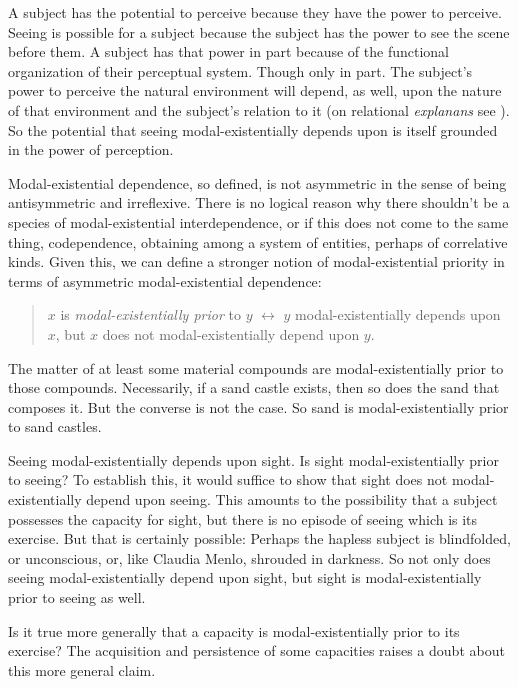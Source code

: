 \documentclass[12pt]{article}
\begin{document}

A subject has the potential to perceive because they have the power to perceive. Seeing is possible for a subject because the subject has the power to see the scene before them. A subject has that power in part because of the functional organization of their perceptual system. Though only in part. The subject's power to perceive the natural environment will depend, as well, upon the nature of that environment and the subject's relation to it (on relational \emph{explanans} see \citealt{Peacocke:1993kx,Williamson:2000lr}). So the potential that seeing modal-existentially depends upon is itself grounded in the power of perception.

Modal-existential dependence, so defined, is not asymmetric in the sense of being antisymmetric and irreflexive. There is no logical reason why there shouldn't be a species of modal-existential interdependence, or if this does not come to the same thing, codependence, obtaining among a system of entities, perhaps of correlative kinds. Given this, we can define a stronger notion of modal-existential priority in terms of asymmetric modal-existential dependence:
\begin{quote}
    \( x \) is \emph{modal-existentially prior} to \( y \) \( \leftrightarrow \) \( y \) modal-existentially depends upon \( x \), but \( x \) does not modal-existentially depend upon \( y \).
\end{quote}
The matter of at least some material compounds are modal-existentially prior to those compounds. Necessarily, if a sand castle exists, then so does the sand that composes it. But the converse is not the case. So sand is modal-existentially prior to sand castles.

Seeing modal-existentially depends upon sight. Is sight modal-existentially prior to seeing? To establish this, it would suffice to show that sight does not modal-existentially depend upon seeing. This amounts to the possibility that a subject possesses the capacity for sight, but there is no episode of seeing which is its exercise. But that is certainly possible: Perhaps the hapless subject is blindfolded, or unconscious, or, like Claudia Menlo, shrouded in darkness. So not only does seeing modal-existentially depend upon sight, but sight is modal-existentially prior to seeing as well.

Is it true more generally that a capacity is modal-existentially prior to its exercise? The acquisition and persistence of some capacities raises a doubt about this more general claim.
\end{document}
